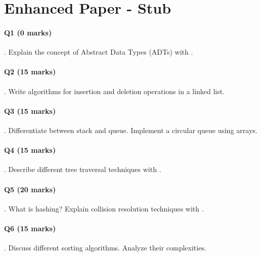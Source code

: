 \documentclass{article}
\begin{document}
\section*{Enhanced Paper - Stub}
\paragraph{Q1 (0 marks)} . Explain the concept of Abstract Data Types (ADTs) with \nexamples.

\paragraph{Q2 (15 marks)} . Write algorithms for insertion and deletion operations in a linked list.

\paragraph{Q3 (15 marks)} . Differentiate between stack and queue. Implement a circular queue using arrays.

\paragraph{Q4 (15 marks)} . Describe different tree traversal techniques with \nexamples.

\paragraph{Q5 (20 marks)} . What is hashing? Explain collision resolution techniques with \nexamples.

\paragraph{Q6 (15 marks)} . Discuss different sorting algorithms. Analyze their \ntime complexities.
\end{document}
